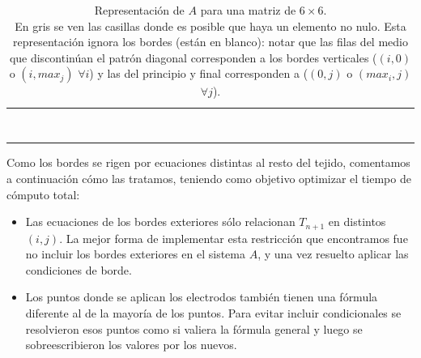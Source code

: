 \documentclass[a4paper]{article}
\begin{document}
\begin{table}[!htbp]
\begin{tabular}{|l|l|l|l|l|l|l|l|l|l|l|l|l|l|l|l|l|l|l|l|l|l|l|l|l|l|l|l|l|l|l|l|l|l|l|l|}
 & & & & & & & & & & & & & & & & & & & & & \cellcolor{mygray} & & & & & \cellcolor{mygray} & \cellcolor{mygray} & \cellcolor{mygray} & & & & & \cellcolor{mygray} & & \\ \hline 
 & & & & & & & & & & & & & & & & & & & & & & \cellcolor{mygray} & & & & & \cellcolor{mygray} & \cellcolor{mygray} & \cellcolor{mygray} & & & & & \cellcolor{mygray} & \\ \hline 
 & & & & & & & & & & & & & & & & & & & & & & & & & & & & & & & & & & & \\ \hline 
 & & & & & & & & & & & & & & & & & & & & & & & & & & & & & & & & & & & \\ \hline 
 & & & & & & & & & & & & & & & & & & & & & & & & & & & & & & & & & & & \\ \hline 
 & & & & & & & & & & & & & & & & & & & & & & & & & & & & & & & & & & & \\ \hline 
 & & & & & & & & & & & & & & & & & & & & & & & & & & & & & & & & & & & \\ \hline 
 & & & & & & & & & & & & & & & & & & & & & & & & & & & & & & & & & & & \\ \hline 
 & & & & & & & & & & & & & & & & & & & & & & & & & & & & & & & & & & & \\ \hline
\end{tabular}
\caption{Representación de $A$ para una matriz de $6\times6$. \\ En gris se ven las casillas donde es posible que haya un elemento no nulo. Esta representación ignora los bordes (están en blanco): notar que las filas del medio que discontinúan el patrón diagonal corresponden a los bordes verticales ($(i,0)$ o $(i,max_j)$ $\forall i$) y las del principio y final corresponden a ($(0,j)$ o $(max_i,j)$ $\forall j$). }
\label{table:matriz_a}
\end{table}

Como los bordes se rigen por ecuaciones distintas al resto del tejido, comentamos a continuación
cómo las tratamos, teniendo como objetivo optimizar el tiempo de cómputo total:
\begin{itemize}
\item Las ecuaciones de los bordes exteriores sólo
relacionan $T_{n+1}$ en distintos $(i,j)$. La mejor forma de implementar esta
restricción que encontramos fue no incluir los bordes exteriores en el sistema $A$, y una vez
resuelto aplicar las condiciones de borde.
\item Los puntos donde se aplican los electrodos también tienen una 
fórmula diferente al de la mayoría de los puntos. Para evitar incluir 
condicionales se resolvieron esos puntos como si valiera la fórmula general
y luego se sobreescribieron los valores por los nuevos.
\end{itemize}
\end{document}

